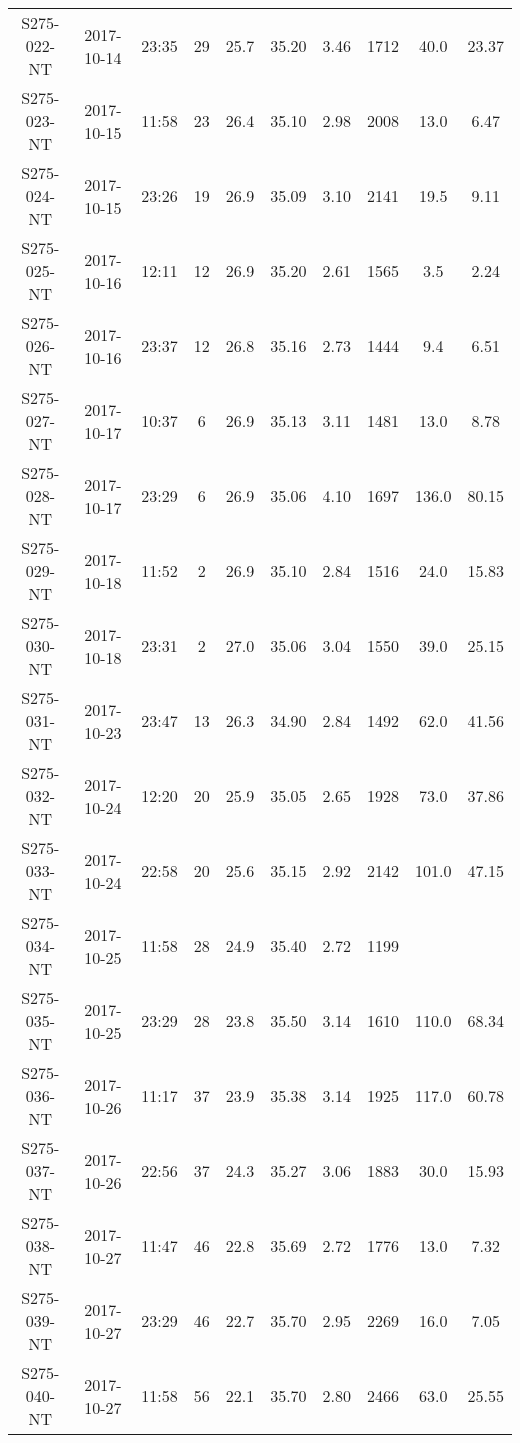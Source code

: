 \begin{longtable}{cccccccccc}
  S275-022-NT & 2017-10-14 & 23:35 & 29 & 25.7 & 35.20 & 3.46 & 1712 & 40.0 & 23.37 \\ 
  S275-023-NT & 2017-10-15 & 11:58 & 23 & 26.4 & 35.10 & 2.98 & 2008 & 13.0 & 6.47 \\ 
  S275-024-NT & 2017-10-15 & 23:26 & 19 & 26.9 & 35.09 & 3.10 & 2141 & 19.5 & 9.11 \\ 
  S275-025-NT & 2017-10-16 & 12:11 & 12 & 26.9 & 35.20 & 2.61 & 1565 & 3.5 & 2.24 \\ 
  S275-026-NT & 2017-10-16 & 23:37 & 12 & 26.8 & 35.16 & 2.73 & 1444 & 9.4 & 6.51 \\ 
  S275-027-NT & 2017-10-17 & 10:37 & 6 & 26.9 & 35.13 & 3.11 & 1481 & 13.0 & 8.78 \\ 
  S275-028-NT & 2017-10-17 & 23:29 & 6 & 26.9 & 35.06 & 4.10 & 1697 & 136.0 & 80.15 \\ 
  S275-029-NT & 2017-10-18 & 11:52 & 2 & 26.9 & 35.10 & 2.84 & 1516 & 24.0 & 15.83 \\ 
  S275-030-NT & 2017-10-18 & 23:31 & 2 & 27.0 & 35.06 & 3.04 & 1550 & 39.0 & 25.15 \\ 
  S275-031-NT & 2017-10-23 & 23:47 & 13 & 26.3 & 34.90 & 2.84 & 1492 & 62.0 & 41.56 \\ 
  S275-032-NT & 2017-10-24 & 12:20 & 20 & 25.9 & 35.05 & 2.65 & 1928 & 73.0 & 37.86 \\ 
  S275-033-NT & 2017-10-24 & 22:58 & 20 & 25.6 & 35.15 & 2.92 & 2142 & 101.0 & 47.15 \\ 
  S275-034-NT & 2017-10-25 & 11:58 & 28 & 24.9 & 35.40 & 2.72 & 1199 &  &  \\ 
  S275-035-NT & 2017-10-25 & 23:29 & 28 & 23.8 & 35.50 & 3.14 & 1610 & 110.0 & 68.34 \\ 
  S275-036-NT & 2017-10-26 & 11:17 & 37 & 23.9 & 35.38 & 3.14 & 1925 & 117.0 & 60.78 \\ 
  S275-037-NT & 2017-10-26 & 22:56 & 37 & 24.3 & 35.27 & 3.06 & 1883 & 30.0 & 15.93 \\ 
  S275-038-NT & 2017-10-27 & 11:47 & 46 & 22.8 & 35.69 & 2.72 & 1776 & 13.0 & 7.32 \\ 
  S275-039-NT & 2017-10-27 & 23:29 & 46 & 22.7 & 35.70 & 2.95 & 2269 & 16.0 & 7.05 \\ 
  S275-040-NT & 2017-10-27 & 11:58 & 56 & 22.1 & 35.70 & 2.80 & 2466 & 63.0 & 25.55 \\ 
  \hline
\end{longtable}

